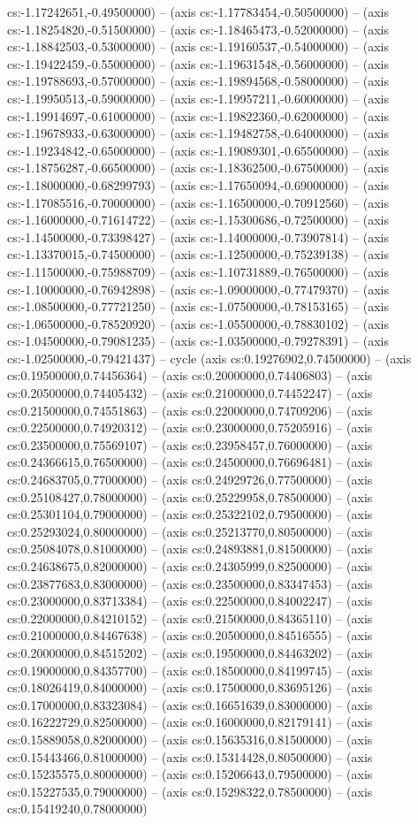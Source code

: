cs:-1.17242651,-0.49500000) -- (axis cs:-1.17783454,-0.50500000) -- (axis cs:-1.18254820,-0.51500000) -- (axis cs:-1.18465473,-0.52000000) -- (axis cs:-1.18842503,-0.53000000) -- (axis cs:-1.19160537,-0.54000000) -- (axis cs:-1.19422459,-0.55000000) -- (axis cs:-1.19631548,-0.56000000) -- (axis cs:-1.19788693,-0.57000000) -- (axis cs:-1.19894568,-0.58000000) -- (axis cs:-1.19950513,-0.59000000) -- (axis cs:-1.19957211,-0.60000000) -- (axis cs:-1.19914697,-0.61000000) -- (axis cs:-1.19822360,-0.62000000) -- (axis cs:-1.19678933,-0.63000000) -- (axis cs:-1.19482758,-0.64000000) -- (axis cs:-1.19234842,-0.65000000) -- (axis cs:-1.19089301,-0.65500000) -- (axis cs:-1.18756287,-0.66500000) -- (axis cs:-1.18362500,-0.67500000) -- (axis cs:-1.18000000,-0.68299793) -- (axis cs:-1.17650094,-0.69000000) -- (axis cs:-1.17085516,-0.70000000) -- (axis cs:-1.16500000,-0.70912560) -- (axis cs:-1.16000000,-0.71614722) -- (axis cs:-1.15300686,-0.72500000) -- (axis cs:-1.14500000,-0.73398427) -- (axis cs:-1.14000000,-0.73907814) -- (axis cs:-1.13370015,-0.74500000) -- (axis cs:-1.12500000,-0.75239138) -- (axis cs:-1.11500000,-0.75988709) -- (axis cs:-1.10731889,-0.76500000) -- (axis cs:-1.10000000,-0.76942898) -- (axis cs:-1.09000000,-0.77479370) -- (axis cs:-1.08500000,-0.77721250) -- (axis cs:-1.07500000,-0.78153165) -- (axis cs:-1.06500000,-0.78520920) -- (axis cs:-1.05500000,-0.78830102) -- (axis cs:-1.04500000,-0.79081235) -- (axis cs:-1.03500000,-0.79278391) -- (axis cs:-1.02500000,-0.79421437) -- cycle (axis cs:0.19276902,0.74500000) -- (axis cs:0.19500000,0.74456364) -- (axis cs:0.20000000,0.74406803) -- (axis cs:0.20500000,0.74405432) -- (axis cs:0.21000000,0.74452247) -- (axis cs:0.21500000,0.74551863) -- (axis cs:0.22000000,0.74709206) -- (axis cs:0.22500000,0.74920312) -- (axis cs:0.23000000,0.75205916) -- (axis cs:0.23500000,0.75569107) -- (axis cs:0.23958457,0.76000000) -- (axis cs:0.24366615,0.76500000) -- (axis cs:0.24500000,0.76696481) -- (axis cs:0.24683705,0.77000000) -- (axis cs:0.24929726,0.77500000) -- (axis cs:0.25108427,0.78000000) -- (axis cs:0.25229958,0.78500000) -- (axis cs:0.25301104,0.79000000) -- (axis cs:0.25322102,0.79500000) -- (axis cs:0.25293024,0.80000000) -- (axis cs:0.25213770,0.80500000) -- (axis cs:0.25084078,0.81000000) -- (axis cs:0.24893881,0.81500000) -- (axis cs:0.24638675,0.82000000) -- (axis cs:0.24305999,0.82500000) -- (axis cs:0.23877683,0.83000000) -- (axis cs:0.23500000,0.83347453) -- (axis cs:0.23000000,0.83713384) -- (axis cs:0.22500000,0.84002247) -- (axis cs:0.22000000,0.84210152) -- (axis cs:0.21500000,0.84365110) -- (axis cs:0.21000000,0.84467638) -- (axis cs:0.20500000,0.84516555) -- (axis cs:0.20000000,0.84515202) -- (axis cs:0.19500000,0.84463202) -- (axis cs:0.19000000,0.84357700) -- (axis cs:0.18500000,0.84199745) -- (axis cs:0.18026419,0.84000000) -- (axis cs:0.17500000,0.83695126) -- (axis cs:0.17000000,0.83323084) -- (axis cs:0.16651639,0.83000000) -- (axis cs:0.16222729,0.82500000) -- (axis cs:0.16000000,0.82179141) -- (axis cs:0.15889058,0.82000000) -- (axis cs:0.15635316,0.81500000) -- (axis cs:0.15443466,0.81000000) -- (axis cs:0.15314428,0.80500000) -- (axis cs:0.15235575,0.80000000) -- (axis cs:0.15206643,0.79500000) -- (axis cs:0.15227535,0.79000000) -- (axis cs:0.15298322,0.78500000) -- (axis cs:0.15419240,0.78000000) 